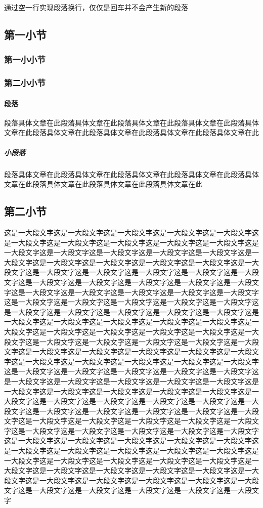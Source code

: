 \documentclass[a4paper,cs4size,UTF8,winfonts,boldfont,slantfont]{ctexart}
\begin{document}
	通过空一行实现段落换行，仅仅是回车并不会产生新的段落
	\subsection{第一小节}
	\subsubsection{第一小小节}
	\subsubsection{第二小小节}
	\paragraph{段落}段落具体文章在此段落具体文章在此段落具体文章在此段落具体文章在此段落具体文章在此段落具体文章在此段落具体文章在此段落具体文章在此段落具体文章在此
	\subparagraph{小段落}段落具体文章在此段落具体文章在此段落具体文章在此段落具体文章在此段落具体文章在此段落具体文章在此段落具体文章在此段落具体文章在此
	\subsection{第二小节}
	这是一大段文字这是一大段文字这是一大段文字这是一大段文字这是一大段文字这是一大段文字这是一大段文字这是一大段文字这是一大段文字这是一大段文字这是一大段文字这是一大段文字这是一大段文字这是一大段文字这是一大段文字这是一大段文字这是一大段文字这是一大段文字这是一大段文字这是一大段文字这是一大段文字这是一大段文字这是一大段文字这是一大段文字这是一大段文字这是一大段文字这是一大段文字这是一大段文字这是一大段文字这是一大段文字这是一大段文字这是一大段文字这是一大段文字这是一大段文字这是一大段文字这是一大段文字这是一大段文字这是一大段文字这是一大段文字这是一大段文字这是一大段文字这是一大段文字这是一大段文字这是一大段文字这是一大段文字这是一大段文字这是一大段文字这是一大段文字这是一大段文字这是一大段文字这是一大段文字这是一大段文字这是一大段文字这是一大段文字这是一大段文字这是一大段文字这是一大段文字这是一大段文字这是一大段文字这是一大段文字这是一大段文字这是一大段文字这是一大段文字这是一大段文字这是一大段文字这是一大段文字这是一大段文字这是一大段文字这是一大段文字这是一大段文字这是一大段文字这是一大段文字这是一大段文字这是一大段文字这是一大段文字这是一大段文字这是一大段文字这是一大段文字这是一大段文字这是一大段文字这是一大段文字这是一大段文字这是一大段文字这是一大段文字这是一大段文字这是一大段文字这是一大段文字这是一大段文字这是一大段文字这是一大段文字这是一大段文字这是一大段文字这是一大段文字这是一大段文字这是一大段文字这是一大段文字这是一大段文字这是一大段文字这是一大段文字这是一大段文字这是一大段文字这是一大段文字这是一大段文字这是一大段文字这是一大段文字这是一大段文字这是一大段文字这是一大段文字这是一大段文字这是一大段文字这是一大段文字这是一大段文字这是一大段文字这是一大段文字这是一大段文字这是一大段文字这是一大段文字这是一大段文字这是一大段文字这是一大段文字这是一大段文字这是一大段文字这是一大段文字这是一大段文字这是一大段文字这是一大段文字这是一大段文字这是一大段文字这是一大段文字这是一大段文字这是一大段文字这是一大段文字这是一大段文字这是一大段文字这是一大段文字这是一大段文字这是一大段文字这是一大段文字这是一大段文字
\end{document}

